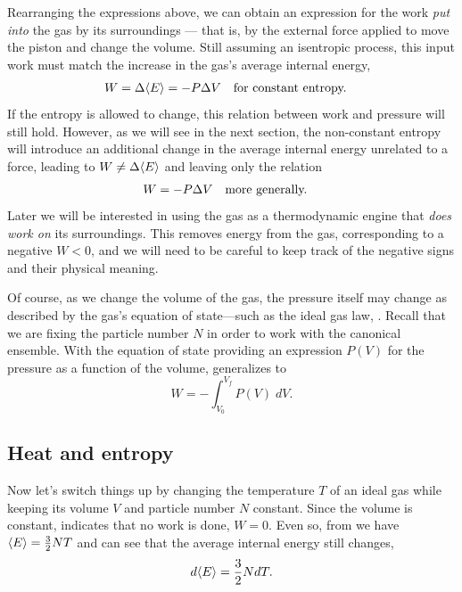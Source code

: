 Rearranging the expressions above, we can obtain an expression for the work \textit{put into} the gas by its surroundings --- that is, by the external force applied to move the piston and change the volume.
Still assuming an isentropic process, this input work must match the increase in the gas's average internal energy,
\begin{align*}
  W & = \Delta\!\left\langle E \right\rangle = -P \Delta V & & \mbox{for constant entropy.}
\end{align*}
If the entropy is allowed to change, this relation between work and pressure will still hold.
However, as we will see in the next section, the non-constant entropy will introduce an additional change in the average internal energy unrelated to a force, leading to $W \neq \Delta\!\left\langle E \right\rangle$ and leaving only the relation
\begin{align}
  \label{eq:work_constP}
  W & = -P \Delta V & & \mbox{more generally.}
\end{align}
Later we will be interested in using the gas as a thermodynamic engine that \textit{does work on} its surroundings.
This removes energy from the gas, corresponding to a negative $W < 0$, and we will need to be careful to keep track of the negative signs and their physical meaning.

Of course, as we change the volume of the gas, the pressure itself may change as described by the gas's equation of state---such as the ideal gas law, .
Recall that we are fixing the particle number $N$ in order to work with the canonical ensemble.
With the equation of state providing an expression $P(V)$ for the pressure as a function of the volume,  generalizes to
\begin{equation}
  \label{eq:work}
  W = -\int_{V_0}^{V_f} P(V) \; dV.
\end{equation}



\subsection{Heat and entropy}
Now let's switch things up by changing the temperature $T$ of an ideal gas while keeping its volume $V$ and particle number $N$ constant.
Since the volume is constant,  indicates that no work is done, $W = 0$.
Even so, from  we have $\left\langle E \right\rangle = \frac{3}{2} NT$ and can see that the average internal energy still changes,
\begin{equation}
  \label{eq:dE_dT}
  d\!\left\langle E \right\rangle = \frac{3}{2} N dT.
\end{equation}

